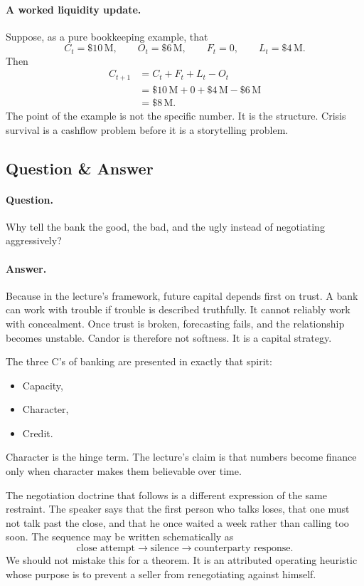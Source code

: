 \paragraph{A worked liquidity update.}
Suppose, as a pure bookkeeping example, that
\[
C_t=\$10\,\mathrm{M},\qquad O_t=\$6\,\mathrm{M},\qquad F_t=0,\qquad L_t=\$4\,\mathrm{M}.
\]
Then
\begin{align}
C_{t+1} &= C_t + F_t + L_t - O_t\\
&= \$10\,\mathrm{M}+0+\$4\,\mathrm{M}-\$6\,\mathrm{M}\\
&= \$8\,\mathrm{M}.
\end{align}
The point of the example is not the specific number. It is the structure. Crisis survival is a cashflow problem before it is a storytelling problem.

\subsection{Question \& Answer}

\paragraph{Question.}
Why tell the bank the good, the bad, and the ugly instead of negotiating aggressively?

\paragraph{Answer.}
Because in the lecture's framework, future capital depends first on trust. A bank can work with trouble if trouble is described truthfully. It cannot reliably work with concealment. Once trust is broken, forecasting fails, and the relationship becomes unstable. Candor is therefore not softness. It is a capital strategy.

The three C's of banking are presented in exactly that spirit:
\begin{itemize}
\item Capacity,
\item Character,
\item Credit.
\end{itemize}
Character is the hinge term. The lecture's claim is that numbers become finance only when character makes them believable over time.

The negotiation doctrine that follows is a different expression of the same restraint. The speaker says that the first person who talks loses, that one must not talk past the close, and that he once waited a week rather than calling too soon. The sequence may be written schematically as
\begin{equation}
\text{close attempt}\longrightarrow \text{silence}\longrightarrow \text{counterparty response}.
\end{equation}
We should not mistake this for a theorem. It is an attributed operating heuristic whose purpose is to prevent a seller from renegotiating against himself.

